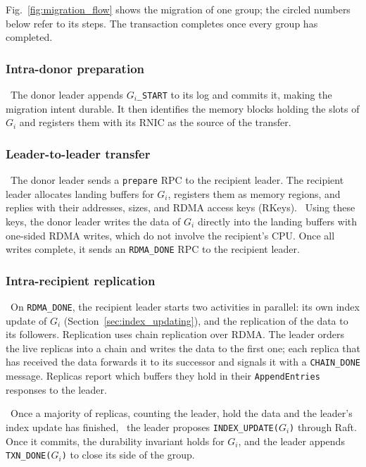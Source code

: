 Fig.~\ref{fig:migration_flow} shows the migration of one group; the circled numbers below refer to its steps.
The transaction completes once every group has completed.

\subsubsection{Intra-donor preparation}
\label{sec:intra-donor}

~The donor leader appends \texttt{$G_i$\_START} to its log and commits it, making the migration intent durable.
It then identifies the memory blocks holding the slots of $G_i$ and registers them with its RNIC as the source of the transfer.

\subsubsection{Leader-to-leader transfer}
\label{sec:leader-to-leader}

~The donor leader sends a \texttt{prepare} RPC to the recipient leader.
The recipient leader allocates landing buffers for $G_i$, registers them as memory regions, and replies with their addresses, sizes, and RDMA access keys (RKeys).
~Using these keys, the donor leader writes the data of $G_i$ directly into the landing buffers with one-sided RDMA writes, which do not involve the recipient's CPU.
Once all writes complete, it sends an \texttt{RDMA\_DONE} RPC to the recipient leader.

\subsubsection{Intra-recipient replication}
\label{sec:intra-recipient}

~On \texttt{RDMA\_DONE}, the recipient leader starts two activities in parallel: its own index update of $G_i$ (Section~\ref{sec:index_updating}), and the replication of the data to its followers.
Replication uses chain replication over RDMA.
The leader orders the live replicas into a chain and writes the data to the first one; each replica that has received the data forwards it to its successor and signals it with a \texttt{CHAIN\_DONE} message.
Replicas report which buffers they hold in their \texttt{AppendEntries} responses to the leader.

~Once a majority of replicas, counting the leader, hold the data and the leader's index update has finished,
~the leader proposes \texttt{INDEX\_UPDATE($G_i$)} through Raft.
Once it commits, the durability invariant holds for $G_i$, and the leader appends \texttt{TXN\_DONE($G_i$)} to close its side of the group.

